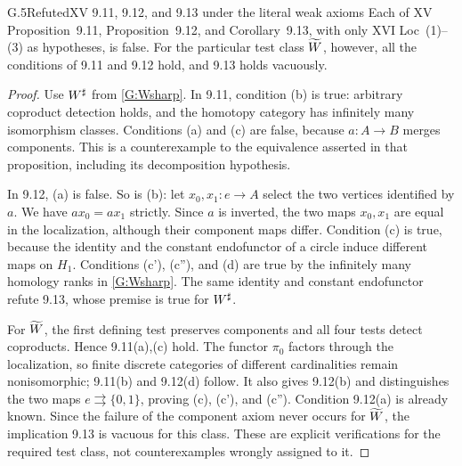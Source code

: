 \begin{claim}{G.5}{Refuted}{XV 9.11, 9.12, and 9.13 under the literal weak axioms}
\label{G:nontriviality-false}
Each of XV Proposition~9.11, Proposition~9.12, and Corollary~9.13,
with only XVI Loc~(1)--(3) as hypotheses, is false.  For the particular
test class $\widetilde W$, however, all the conditions of 9.11 and 9.12 hold,
and 9.13 holds vacuously.
\end{claim}
\begin{proof}
Use $W^{\sharp}$ from \ref{G:Wsharp}.  In 9.11, condition (b) is true:
arbitrary coproduct detection holds, and the homotopy category has
infinitely many isomorphism classes.  Conditions (a) and (c) are false,
because $a:A\to B$ merges components.  This is a counterexample to
the equivalence asserted in that proposition, including its
decomposition hypothesis.

In 9.12, (a) is false.  So is (b): let $x_0,x_1:e\to A$ select the
two vertices identified by $a$.  We have $ax_0=ax_1$ strictly.  Since
$a$ is inverted, the two maps $x_0,x_1$ are equal in the localization,
although their component maps differ.  Condition (c) is true, because
the identity and the constant endofunctor of a circle induce different
maps on $H_1$.  Conditions (c'), (c''), and (d) are true by the
infinitely many homology ranks in \ref{G:Wsharp}.  The same identity
and constant endofunctor refute 9.13, whose premise is true for
$W^{\sharp}$.

For $\widetilde W$, the first defining test preserves components and all four
tests detect coproducts.  Hence 9.11(a),(c) hold.  The functor $\pi_0$
factors through the localization, so finite discrete categories of
different cardinalities remain nonisomorphic; 9.11(b) and 9.12(d)
follow.  It also gives 9.12(b) and distinguishes the two maps
$e\rightrightarrows\{0,1\}$, proving (c), (c'), and (c'').
Condition 9.12(a) is already known.  Since the failure of the
component axiom never occurs for $\widetilde W$, the implication 9.13 is
vacuous for this class.  These are explicit verifications for the
required test class, not counterexamples wrongly assigned to it.
\end{proof}

